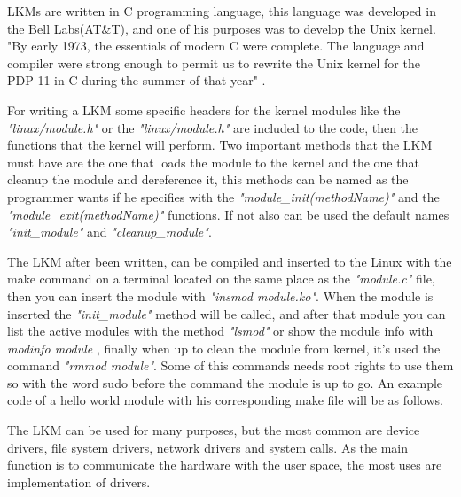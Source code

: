 \documentclass[12pt]{article}
\begin{document}
LKMs are written in C programming language, this language was developed in the Bell Labs(AT\&T), and one of his purposes was to develop the Unix kernel. "By early 1973, the essentials of modern C were complete. The language and compiler were strong enough to permit us to rewrite the Unix kernel for the PDP-11 in C during the summer of that year" \cite{Ritchie}.

For writing a LKM some specific headers for the kernel modules like the \emph{"linux/module.h"} or the \emph{"linux/module.h"} are included to the code, then the functions that the kernel will perform. Two important methods that the LKM must have are the one that loads the module to the kernel and the one that cleanup the module and dereference it, this methods can be named as the programmer wants if he specifies with the \emph{"module\_init(methodName)"} and the \emph{"module\_exit(methodName)"} functions. If not also can be used the default names \emph{"init\_module"} and \emph{"cleanup\_module"}.

The LKM after been written, can be compiled and inserted to the Linux with the make command on a terminal located on the same place as the \emph{"module.c"} file, then you can insert the module with \emph{"insmod module.ko"}. When the module is inserted the  \emph{"init\_module"} method will be called, and after that module you can list the active modules with the method \emph{"lsmod"} or show the module info with \emph{modinfo module} , finally when up to clean the module from kernel, it's used the command \emph{"rmmod module"}. Some of this commands needs root rights to use them so with the word sudo before the command the module is up to go\cite{Henderson06}. An example code of a hello world module with his corresponding make file will be as follows.




The LKM can be used for many purposes, but the most common are device drivers, file system drivers, network drivers and system calls.\cite{Henderson06} As the main function is to communicate the hardware with the user space, the most uses are implementation of drivers. 
\end{document}
